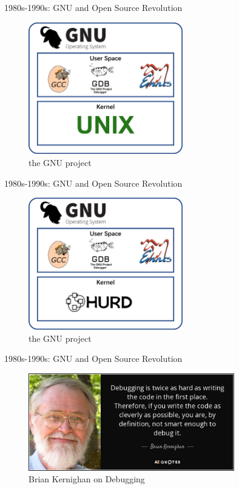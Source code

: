 \documentclass{beamer}
\begin{document}
\begin{frame}[t]{1980s-1990s: GNU and Open Source Revolution}
    \begin{figure}
        \includegraphics[width=0.6\textwidth]{images/gnu2.png}
        \caption{the GNU project}
    \end{figure}
\end{frame}
\begin{frame}[t]{1980s-1990s: GNU and Open Source Revolution}
    \begin{figure}
        \includegraphics[width=0.6\textwidth]{images/gnu3.png}
        \caption{the GNU project}
    \end{figure}
\end{frame}
\begin{frame}[t]{1980s-1990s: GNU and Open Source Revolution}
    \begin{figure}
        \includegraphics[width=0.8\textwidth]{images/quote-debugging.jpg}
        \caption{Brian Kernighan on Debugging}
    \end{figure}
\end{frame}
\end{document}

